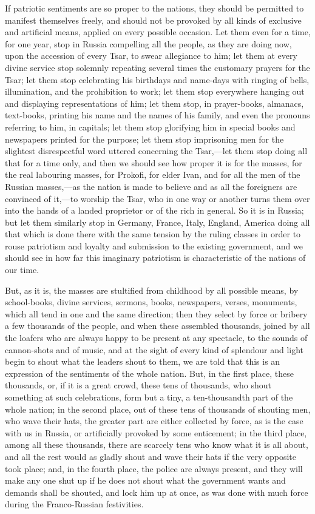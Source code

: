 \documentclass{book}
\begin{document}
If patriotic sentiments are so proper to the nations, they should be permitted to manifest themselves freely, and should not be provoked by all kinds of exclusive and artificial means, applied on every possible occasion. Let them even for a time, for one year, stop in Russia compelling all the people, as they are doing now, upon the accession of every Tsar, to swear allegiance to him; let them at every divine service stop solemnly repeating several times the customary prayers for the Tsar; let them stop celebrating his birthdays and name-days with ringing of bells, illumination, and the prohibition to work; let them stop everywhere hanging out and displaying representations of him; let them stop, in prayer-books, almanacs, text-books, printing his name and the names of his family, and even the pronouns referring to him, in capitals; let them stop glorifying him in special books and newspapers printed for the purpose; let them stop imprisoning men for the slightest disrespectful word uttered concerning the Tsar,—let them stop doing all that for a time only, and then we should see how proper it is for the masses, for the real labouring masses, for Prokofi, for elder Ivan, and for all the men of the Russian masses,—as the nation is made to believe and as all the foreigners are convinced of it,—to worship the Tsar, who in one way or another turns them over into the hands of a landed proprietor or of the rich in general. So it is in Russia; but let them similarly stop in Germany, France, Italy, England, America doing all that which is done there with the same tension by the ruling classes in order to rouse patriotism and loyalty and submission to the existing government, and we should see in how far this imaginary patriotism is characteristic of the nations of our time.

But, as it is, the masses are stultified from childhood by all possible means, by school-books, divine services, sermons, books, newspapers, verses, monuments, which all tend in one and the same direction; then they select by force or bribery a few thousands of the people, and when these assembled thousands, joined by all the loafers who are always happy to be present at any spectacle, to the sounds of cannon-shots and of music, and at the sight of every kind of splendour and light begin to shout what the leaders shout to them, we are told that this is an expression of the sentiments of the whole nation. But, in the first place, these thousands, or, if it is a great crowd, these tens of thousands, who shout something at such celebrations, form but a tiny, a ten-thousandth part of the whole nation; in the second place, out of these tens of thousands of shouting men, who wave their hats, the greater part are either collected by force, as is the case with us in Russia, or artificially provoked by some enticement; in the third place, among all these thousands, there are scarcely tens who know what it is all about, and all the rest would as gladly shout and wave their hats if the very opposite took place; and, in the fourth place, the police are always present, and they will make any one shut up if he does not shout what the government wants and demands shall be shouted, and lock him up at once, as was done with much force during the Franco-Russian festivities.
\end{document}
